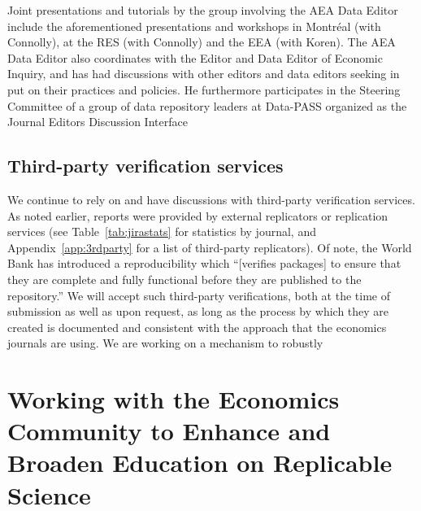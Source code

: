 %
Joint presentations and tutorials by the group involving the AEA Data Editor include the aforementioned presentations and workshops in Montréal (with Connolly), at the RES (with Connolly) and the EEA (with Koren).
%
The AEA Data Editor  also coordinates with the Editor and Data Editor of Economic Inquiry, and has had discussions with other editors and data editors seeking in put on their practices and policies. He furthermore participates in  the Steering Committee of a group of data repository leaders at Data-PASS organized as the Journal Editors Discussion Interface 


\subsection{Third-party verification services}
\label{sec:3rdparty}


We continue to rely on and have discussions with third-party verification services. As noted earlier, \jiraexternal{} reports were provided by external replicators or replication services
(see Table~\ref{tab:jirastats} for statistics by journal, and Appendix~\ref{app:3rdparty} for a list of third-party replicators). Of note, the World Bank has introduced a reproducibility  which ``[verifies packages] to ensure that they are complete and fully functional before they are published to the repository.'' We will accept such third-party verifications, both at the time of submission as well as upon request, as long as the process by which they are created is documented and consistent with the approach that the economics journals are using. We are working on a mechanism to robustly  

\section{Working with the Economics Community to Enhance and Broaden Education on Replicable Science}

